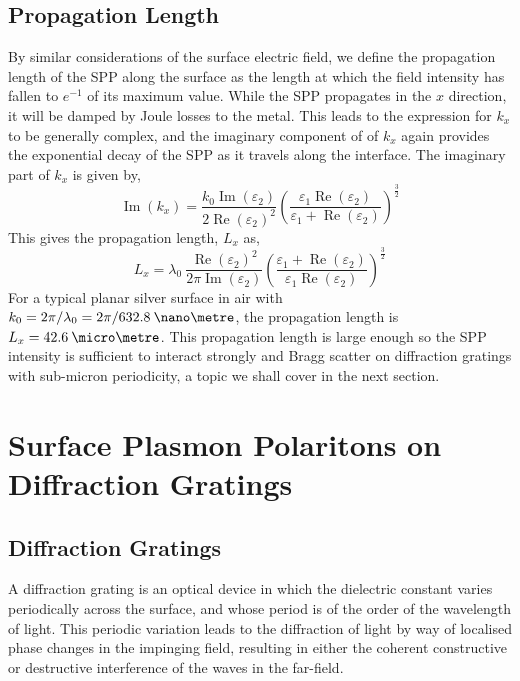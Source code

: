 \subsection{Propagation Length}
By similar considerations of the surface electric field, we define the propagation length of the SPP along the surface as the length at which the field intensity has fallen to $e^{-1}$ of its maximum value. While the SPP propagates in the $x$ direction, it will be damped by Joule losses to the metal. This leads to the expression for $k_x$ to be generally complex, and the imaginary component of of $k_x$ again provides the exponential decay of the SPP as it travels along the interface. The imaginary part of $k_x$ is given by,
\begin{equation}
\operatorname{Im}(k_x)=\frac{k_0 \operatorname{Im}(\varepsilon_2)}{2\operatorname{Re}(\varepsilon_2)^2}\left(\frac{\varepsilon_1\operatorname{Re}(\varepsilon_2)}{\varepsilon_1+\operatorname{Re}(\varepsilon_2)}\right)^{\frac{3}{2}}
\end{equation} 
This gives the propagation length, $L_x$ as,
\begin{equation}
L_x=\lambda_0\:\frac{\operatorname{Re}(\varepsilon_2)^2}{2 \pi \operatorname{Im}(\varepsilon_2)}\left(\frac{\varepsilon_1+\operatorname{Re}(\varepsilon_2)}{\varepsilon_1\operatorname{Re}(\varepsilon_2)}\right)^{\frac{3}{2}}
\end{equation}
For a typical planar silver surface in air with  $k_0=2\pi/\lambda_0=2\pi/632.8\:\nano\metre$, the propagation length is $L_x=42.6\:\micro\metre$. This propagation length is large enough so the SPP intensity is sufficient to interact strongly and Bragg scatter on diffraction  gratings with sub-micron periodicity, a topic we shall cover in the next section.


\section{Surface Plasmon Polaritons on Diffraction Gratings\label{sec:SPPsDG}}
\subsection{Diffraction Gratings}

A diffraction grating is an optical device in which the dielectric constant varies periodically across the surface, and whose period is of the order of the wavelength of light. This periodic variation leads to the diffraction of light by way of localised phase changes in the impinging field, resulting in either the coherent constructive or destructive interference of the waves in the far-field.

